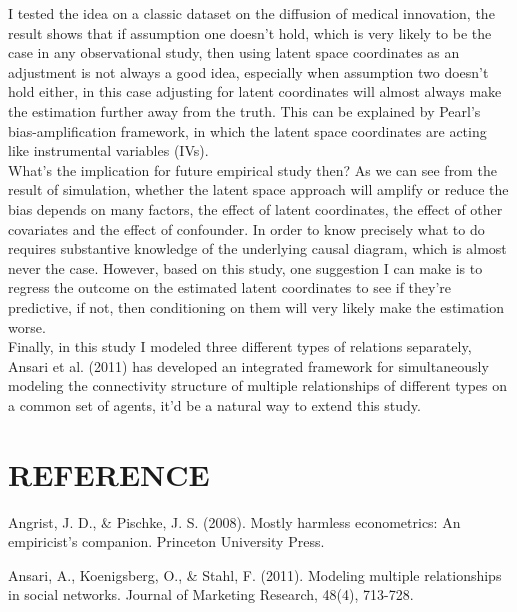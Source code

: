 \documentclass[11pt]{article}
\begin{document}
I tested the idea on a classic dataset on the diffusion of medical innovation, the result shows that if assumption one doesn't hold, which is very likely to be the case in any observational study, then using latent space coordinates as an adjustment is not always a good idea, especially when assumption two doesn't hold either, in this case adjusting for latent coordinates will almost always make the estimation further away from the truth. This can be explained by Pearl's bias-amplification framework, in which the latent space coordinates are acting like instrumental variables (IVs).\\

What's the implication for future empirical study then? As we can see from the result of simulation, whether the latent space approach will amplify or reduce the bias depends on many factors, the effect of latent coordinates, the effect of other covariates and the effect of confounder. In order to know precisely what to do requires substantive knowledge of the underlying causal diagram, which is almost never the case. However, based on this study, one suggestion I can make is to regress the outcome on the estimated latent coordinates to see if they're predictive, if not, then conditioning on them will very likely make the estimation worse.\\

Finally, in this study I modeled three different types of relations separately, Ansari et al. (2011) has developed an integrated framework for simultaneously
modeling the connectivity structure of multiple relationships of different
types on a common set of agents, it'd be a natural way to extend this study.


\section*{REFERENCE}
\indent
\begin{comment}
this is how you comment a block of words 
\end{comment}



\begin{hangparas}{.25in}{1}
Angrist, J. D., \& Pischke, J. S. (2008). Mostly harmless econometrics: An empiricist’s companion. Princeton University Press.
\end{hangparas}

\begin{hangparas}{.25in}{1}
Ansari, A., Koenigsberg, O., \& Stahl, F. (2011). Modeling multiple relationships in social networks. Journal of Marketing Research, 48(4), 713-728.
\end{hangparas}
\end{document}
